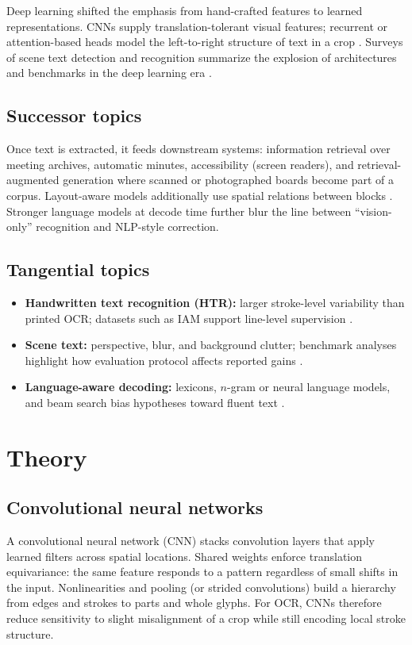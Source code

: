 \documentclass[11pt, a4paper]{article}
\begin{document}
Deep learning shifted the emphasis from hand-crafted features to learned representations. CNNs supply translation-tolerant visual features; recurrent or attention-based heads model the left-to-right structure of text in a crop \cite{jaderberg2016reading,shi2016crnn}. Surveys of scene text detection and recognition summarize the explosion of architectures and benchmarks in the deep learning era \cite{long2021survey}.

\subsection{Successor topics}
Once text is extracted, it feeds downstream systems: information retrieval over meeting archives, automatic minutes, accessibility (screen readers), and retrieval-augmented generation where scanned or photographed boards become part of a corpus. Layout-aware models additionally use spatial relations between blocks \cite{kim2022donut}. Stronger language models at decode time further blur the line between ``vision-only'' recognition and NLP-style correction.

\subsection{Tangential topics}
\begin{itemize}[leftmargin=*]
    \item \textbf{Handwritten text recognition (HTR):} larger stroke-level variability than printed OCR; datasets such as IAM support line-level supervision \cite{marti2002iam}.
    \item \textbf{Scene text:} perspective, blur, and background clutter; benchmark analyses highlight how evaluation protocol affects reported gains \cite{baek2019str,li2021trba}.
    \item \textbf{Language-aware decoding:} lexicons, $n$-gram or neural language models, and beam search bias hypotheses toward fluent text \cite{shi2016crnn}.
\end{itemize}



\section{Theory}

\subsection{Convolutional neural networks}
A convolutional neural network (CNN) stacks convolution layers that apply learned filters across spatial locations. Shared weights enforce translation equivariance: the same feature responds to a pattern regardless of small shifts in the input. Nonlinearities and pooling (or strided convolutions) build a hierarchy from edges and strokes to parts and whole glyphs. For OCR, CNNs therefore reduce sensitivity to slight misalignment of a crop while still encoding local stroke structure.
\end{document}
